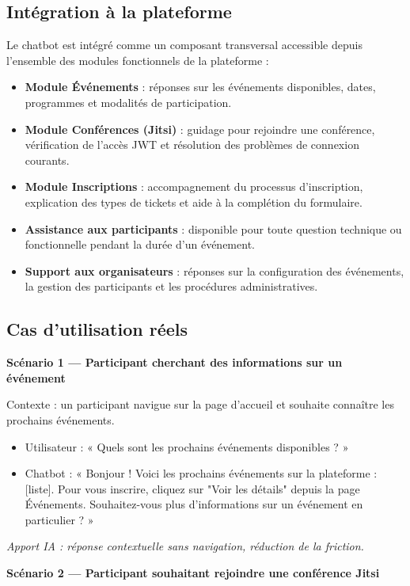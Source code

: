 \subsection{Intégration à la plateforme}
Le chatbot est intégré comme un composant transversal accessible depuis l'ensemble des modules fonctionnels de la plateforme :
\begin{itemize}
    \item \textbf{Module Événements} : réponses sur les événements disponibles, dates, programmes et modalités de participation.
    \item \textbf{Module Conférences (Jitsi)} : guidage pour rejoindre une conférence, vérification de l'accès JWT et résolution des problèmes de connexion courants.
    \item \textbf{Module Inscriptions} : accompagnement du processus d'inscription, explication des types de tickets et aide à la complétion du formulaire.
    \item \textbf{Assistance aux participants} : disponible pour toute question technique ou fonctionnelle pendant la durée d'un événement.
    \item \textbf{Support aux organisateurs} : réponses sur la configuration des événements, la gestion des participants et les procédures administratives.
\end{itemize}

\subsection{Cas d'utilisation réels}

\textbf{Scénario 1 — Participant cherchant des informations sur un événement}

Contexte : un participant navigue sur la page d'accueil et souhaite connaître les prochains événements.
\begin{itemize}
    \item Utilisateur : « Quels sont les prochains événements disponibles ? »
    \item Chatbot : « Bonjour ! Voici les prochains événements sur la plateforme : [liste]. Pour vous inscrire, cliquez sur "Voir les détails" depuis la page Événements. Souhaitez-vous plus d'informations sur un événement en particulier ? »
\end{itemize}
\textit{Apport IA : réponse contextuelle sans navigation, réduction de la friction.}

\textbf{Scénario 2 — Participant souhaitant rejoindre une conférence Jitsi}

